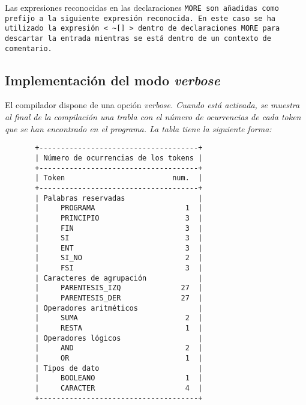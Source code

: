 \documentclass[../main.tex]{subfiles}
\begin{document}

Las expresiones reconocidas en las declaraciones \tt{MORE} son añadidas como prefijo a la siguiente expresión reconocida. En este caso se ha utilizado la expresión \verb|< ~[] >| dentro de declaraciones \tt{MORE} para descartar la entrada mientras se está dentro de un contexto de comentario.

\subsection{Implementación del modo \it{verbose}}
El compilador dispone de una opción \it{verbose}. Cuando está activada, se muestra al final de la compilación una trabla con el número de ocurrencias de cada token que se han encontrado en el programa. La tabla tiene la siguiente forma:
\begin{verbatim}
       +-------------------------------------+
       | Número de ocurrencias de los tokens |
       +-------------------------------------+
       | Token                         num.  |
       +-------------------------------------+
       | Palabras reservadas                 |
       |     PROGRAMA                     1  |
       |     PRINCIPIO                    3  |
       |     FIN                          3  |
       |     SI                           3  |
       |     ENT                          3  |
       |     SI_NO                        2  |
       |     FSI                          3  |
       | Caracteres de agrupación            |
       |     PARENTESIS_IZQ              27  |
       |     PARENTESIS_DER              27  |
       | Operadores aritméticos              |
       |     SUMA                         2  |
       |     RESTA                        1  |
       | Operadores lógicos                  |
       |     AND                          2  |
       |     OR                           1  |
       | Tipos de dato                       |
       |     BOOLEANO                     1  |
       |     CARACTER                     4  |
       +-------------------------------------+
\end{verbatim}
\end{document}
